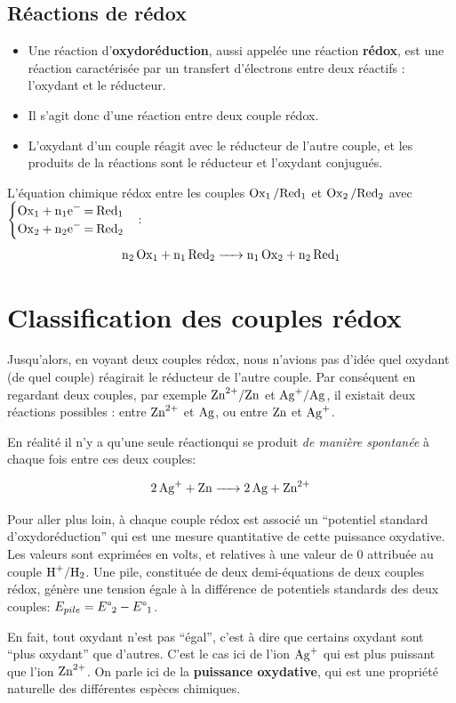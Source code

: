 \documentclass[11pt,a4paper]{article}
\begin{document}
\subsection*{Réactions de rédox}
\begin{itemize}
    \item Une réaction d’\textbf{oxydoréduction}, aussi appelée une réaction \textbf{rédox}, est une réaction caractérisée par un transfert d’électrons entre deux réactifs : l’oxydant et le réducteur.  
    \item Il s’agit donc d’une réaction entre deux couple rédox.
    \item L’oxydant d’un couple réagit avec le réducteur de l’autre couple, et les produits de la réactions sont le réducteur et l’oxydant conjugués.
\end{itemize}

L’équation chimique rédox entre les couples $\ce{Ox_1 /Red_1}$ et $\ce{Ox_2 /Red_2}$ avec 
$\begin{cases}       
\ce{Ox_1 + n1e- = Red_1}\\
\ce{Ox_2 + n2e- = Red_2}
\end{cases}$:
\[\ce{n2 Ox1 + n1 Red2 -> n1 Ox2 + n2 Red1}\]

\section{Classification des couples rédox}
Jusqu'alors, en voyant deux couples rédox, nous n'avions pas d'idée quel oxydant (de quel couple) réagirait le réducteur de l'autre couple.  Par conséquent en regardant deux couples, par exemple $\couple{Zn^2+}{Zn}$ et $\couple{Ag+}{Ag}$, il existait deux réactions possibles : entre $\ce{Zn^2+}$ et $\ce{Ag}$, ou entre $\ce{Zn}$ et $\ce{Ag+}$. 

En réalité il n'y a qu'une seule réactionqui se produit \textit{de manière spontanée} à chaque fois entre ces deux couples: 

\[ \ce{2Ag+ + Zn -> 2 Ag + Zn^2+} \]

\begin{table} 
\begin{rmrq} 
\small{Pour aller plus loin, à chaque couple rédox est associé un ``potentiel standard d'oxydoréduction'' qui est une mesure quantitative de cette puissance oxydative. Les valeurs sont exprimées en volts, et relatives à une valeur de $0$ attribuée au couple $\couple{H+}{H2}$. Une pile, constituée de deux demi-équations de deux couples rédox, génère une tension égale à la différence de potentiels standards des deux couples: $E_{pile} = E\degree_2 - E\degree_1$. } 
\end{rmrq} 
\end{table}
En fait, tout oxydant n'est pas ``égal'', c'est à dire que certains oxydant sont ``plus oxydant'' que d'autres. C'est le cas ici de l'ion $\ce{Ag+}$ qui est plus puissant que l'ion $\ce{Zn^2+}$. On parle ici de la \textbf{puissance oxydative}, qui est une propriété naturelle des différentes espèces chimiques. 
\end{document}
